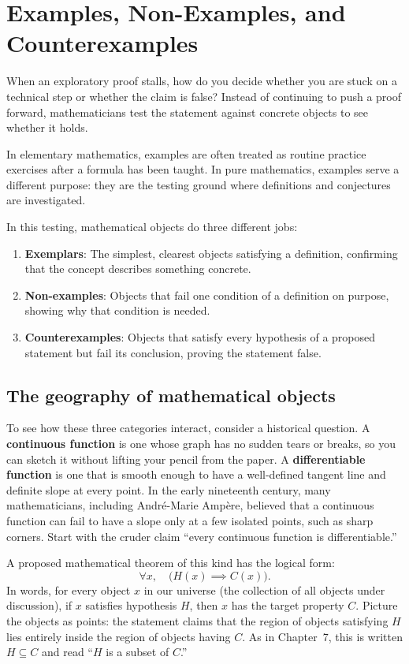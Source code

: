 \section{Examples, Non-Examples, and Counterexamples}
\chapterline

When an exploratory proof stalls, how do you decide whether you are stuck on a technical step or whether the claim is false? Instead of continuing to push a proof forward, mathematicians test the statement against concrete objects to see whether it holds.

In elementary mathematics, examples are often treated as routine practice exercises after a formula has been taught. In pure mathematics, examples serve a different purpose: they are the testing ground where definitions and conjectures are investigated.

In this testing, mathematical objects do three different jobs:
\begin{enumerate}
\item \textbf{Exemplars}: The simplest, clearest objects satisfying a definition, confirming that the concept describes something concrete.
\item \textbf{Non-examples}: Objects that fail one condition of a definition on purpose, showing why that condition is needed.
\item \textbf{Counterexamples}: Objects that satisfy every hypothesis of a proposed statement but fail its conclusion, proving the statement false.
\end{enumerate}

\subsection{The geography of mathematical objects}

To see how these three categories interact, consider a historical question. A \textbf{continuous function} is one whose graph has no sudden tears or breaks, so you can sketch it without lifting your pencil from the paper. A \textbf{differentiable function} is one that is smooth enough to have a well-defined tangent line and definite slope at every point. In the early nineteenth century, many mathematicians, including Andr\'e-Marie Amp\`ere, believed that a continuous function can fail to have a slope only at a few isolated points, such as sharp corners. Start with the cruder claim ``every continuous function is differentiable.''

A proposed mathematical theorem of this kind has the logical form:
\[
\forall x, \quad \bigl(H(x) \implies C(x)\bigr).
\]
In words, for every object $x$ in our universe (the collection of all objects under discussion), if $x$ satisfies hypothesis $H$, then $x$ has the target property $C$. Picture the objects as points: the statement claims that the region of objects satisfying $H$ lies entirely inside the region of objects having $C$. As in Chapter~7, this is written $H \subseteq C$ and read ``$H$ is a subset of $C$.''

